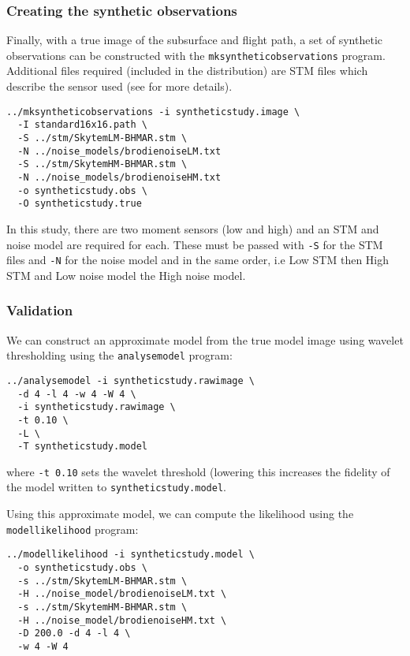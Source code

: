 \documentclass[a4paper,12pt]{article}
\begin{document}
\subsubsection{Creating the synthetic observations}

Finally, with a true image of the subsurface and flight path, a set of
synthetic observations can be constructed with the {\tt mksyntheticobservations}
program. Additional files required (included in the distribution) are STM
files which describe the sensor used (see \citet{GAAEM:2016:A} for more details).

\begin{verbatim}
../mksyntheticobservations -i syntheticstudy.image \
  -I standard16x16.path \
  -S ../stm/SkytemLM-BHMAR.stm \
  -N ../noise_models/brodienoiseLM.txt
  -S ../stm/SkytemHM-BHMAR.stm \
  -N ../noise_models/brodienoiseHM.txt
  -o syntheticstudy.obs \
  -O syntheticstudy.true
\end{verbatim}

In this study, there are two moment sensors (low and high) and an STM
and noise model are required for each. These must be passed with {\tt -S}
for the STM files and {\tt -N} for the noise model and in the same order,
i.e Low STM then High STM and Low noise model the High noise model.

\subsubsection{Validation}

We can construct an approximate model from the true model image using wavelet
thresholding using the {\tt analysemodel} program:

\begin{verbatim}
../analysemodel -i syntheticstudy.rawimage \
  -d 4 -l 4 -w 4 -W 4 \
  -i syntheticstudy.rawimage \
  -t 0.10 \
  -L \
  -T syntheticstudy.model
\end{verbatim}

where {\tt -t 0.10} sets the wavelet threshold (lowering this increases
the fidelity of the model written to {\tt syntheticstudy.model}.

Using this approximate model, we can compute the likelihood using
the {\tt modellikelihood} program:

\begin{verbatim}
../modellikelihood -i syntheticstudy.model \
  -o syntheticstudy.obs \
  -s ../stm/SkytemLM-BHMAR.stm \
  -H ../noise_model/brodienoiseLM.txt \
  -s ../stm/SkytemHM-BHMAR.stm \
  -H ../noise_model/brodienoiseHM.txt \
  -D 200.0 -d 4 -l 4 \
  -w 4 -W 4 
\end{verbatim}
\end{document}
